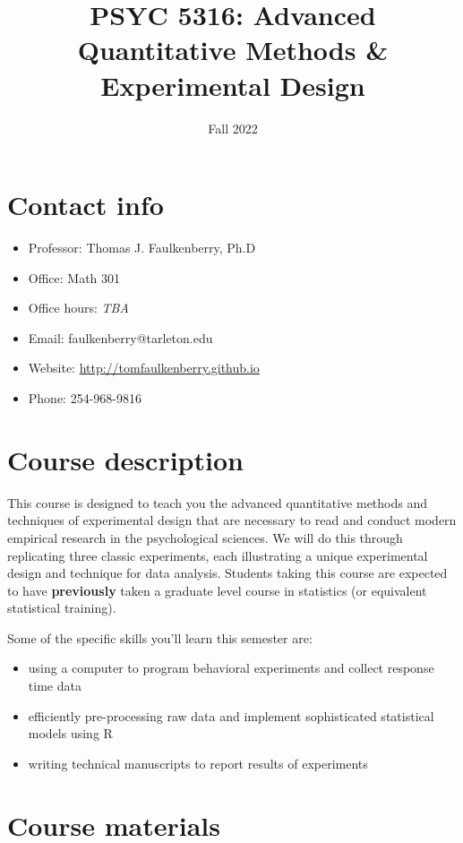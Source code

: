 \documentclass[10pt]{article}
\date{Fall 2022}
\title{PSYC 5316: Advanced Quantitative Methods \& Experimental Design}
\begin{document}
\maketitle

\section*{Contact info}
\label{sec:orgf336317}
\begin{itemize}
\item Professor: Thomas J. Faulkenberry, Ph.D
\item Office: Math 301
\item Office hours: \emph{TBA}
\item Email: faulkenberry@tarleton.edu
\item Website: \url{http://tomfaulkenberry.github.io}
\item Phone: 254-968-9816
\end{itemize}

\section*{Course description}
\label{sec:org171faed}

This course is designed to teach you the advanced quantitative methods and techniques of experimental design that are necessary to read and conduct modern empirical research in the psychological sciences. We will do this through replicating three classic experiments, each illustrating a unique experimental design and technique for data analysis.  Students taking this course are expected to have \textbf{previously} taken a graduate level course in statistics (or equivalent statistical training). 

Some of the specific skills you'll learn this semester are:
\begin{itemize}
\item using a computer to program behavioral experiments and collect response time data
\item efficiently pre-processing raw data and implement sophisticated statistical models using R
\item writing technical manuscripts to report results of experiments
\end{itemize}

\section*{Course materials}
\label{sec:orge6b825d}
\end{document}
